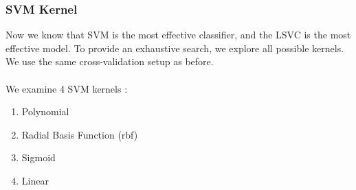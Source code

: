 \documentclass{article}
\begin{document}
\subsubsection{SVM Kernel}
\label{sec:results-classification-svm-kernel}

Now we know that SVM is the most effective classifier, and the LSVC is the most effective model.
To provide an exhaustive search, we explore all possible kernels.
We use the same cross-validation setup as before.
\\\\
We examine 4 SVM kernels \cite{sklearn2021feature}:

\begin{enumerate}
  \item Polynomial
  \item Radial Basis Function (rbf)
  \item Sigmoid
  \item Linear \cite{aizerman1964theoretical}
\end{enumerate}
\end{document}
